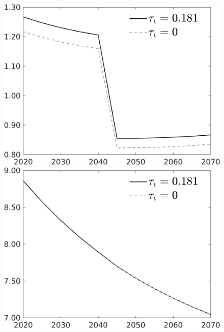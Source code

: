 \documentclass[12pt]{article}
\begin{document}
\begin{figure}[h!!]
\begin{minipage}[]{0.32\textwidth}
	\end{minipage}	
	\begin{minipage}[]{0.32\textwidth}
		\includegraphics[width=1\textwidth]{../../codding_model/own_basedOnFried/optimalPol_010922_revision/figures/all_13Sept22/CompTauf_bytaul_Reg0_gAf_spillover0_nsk1_xgr0_knspil0_sep1_LFlimit1_emsbase0_countec0_GovRev0_etaa0.79_lgd1.png}
	\end{minipage}	
	\begin{minipage}[]{0.32\textwidth}
		\includegraphics[width=1\textwidth]{../../codding_model/own_basedOnFried/optimalPol_010922_revision/figures/all_13Sept22/CompTauf_bytaul_Reg0_gAn_spillover0_nsk1_xgr0_knspil0_sep1_LFlimit1_emsbase0_countec0_GovRev0_etaa0.79_lgd1.png}

\end{minipage}
\end{figure}
\end{document}
